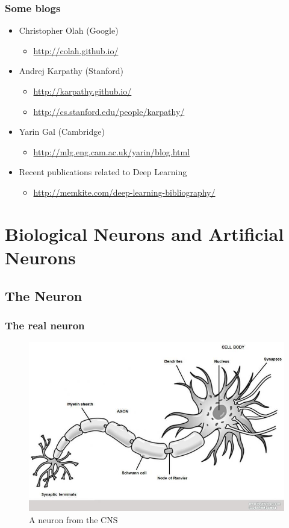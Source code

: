 \begin{frame}
  \frametitle{Some blogs}
  \begin{itemize}
  \item Christopher Olah (Google)
    \begin{itemize}
    \item \url{http://colah.github.io/}
    \end{itemize}
  \item Andrej Karpathy (Stanford)
    \begin{itemize}
    \item \url{http://karpathy.github.io/}
    \item \url{http://cs.stanford.edu/people/karpathy/}
    \end{itemize}
  \item Yarin Gal (Cambridge)
    \begin{itemize}
    \item \url{http://mlg.eng.cam.ac.uk/yarin/blog.html}
    \end{itemize}
  \item Recent publications related to Deep Learning
    \begin{itemize}
    \item \url{http://memkite.com/deep-learning-bibliography/}
    \end{itemize}
  \end{itemize}
\end{frame}

\section{Biological Neurons and Artificial Neurons}
\label{sec:neurons}

\subsection{The Neuron}
\label{sec:neuron}

\begin{frame}
  \frametitle{The real neuron}
  \begin{figure}[h!]
    \centering
    \includegraphics[height=.7\textheight]{graphics/neuron.jpg}
    \caption{A neuron from the CNS}
    \label{fig:realneuron}
  \end{figure}
\end{frame}

